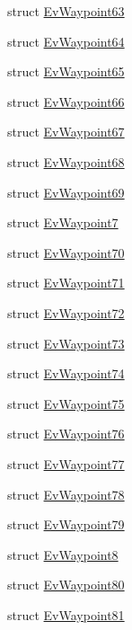 \begin{DoxyCompactItemize}
struct \hyperlink{structmove__base__z__client_1_1EvWaypoint63}{Ev\+Waypoint63}
\item 
struct \hyperlink{structmove__base__z__client_1_1EvWaypoint64}{Ev\+Waypoint64}
\item 
struct \hyperlink{structmove__base__z__client_1_1EvWaypoint65}{Ev\+Waypoint65}
\item 
struct \hyperlink{structmove__base__z__client_1_1EvWaypoint66}{Ev\+Waypoint66}
\item 
struct \hyperlink{structmove__base__z__client_1_1EvWaypoint67}{Ev\+Waypoint67}
\item 
struct \hyperlink{structmove__base__z__client_1_1EvWaypoint68}{Ev\+Waypoint68}
\item 
struct \hyperlink{structmove__base__z__client_1_1EvWaypoint69}{Ev\+Waypoint69}
\item 
struct \hyperlink{structmove__base__z__client_1_1EvWaypoint7}{Ev\+Waypoint7}
\item 
struct \hyperlink{structmove__base__z__client_1_1EvWaypoint70}{Ev\+Waypoint70}
\item 
struct \hyperlink{structmove__base__z__client_1_1EvWaypoint71}{Ev\+Waypoint71}
\item 
struct \hyperlink{structmove__base__z__client_1_1EvWaypoint72}{Ev\+Waypoint72}
\item 
struct \hyperlink{structmove__base__z__client_1_1EvWaypoint73}{Ev\+Waypoint73}
\item 
struct \hyperlink{structmove__base__z__client_1_1EvWaypoint74}{Ev\+Waypoint74}
\item 
struct \hyperlink{structmove__base__z__client_1_1EvWaypoint75}{Ev\+Waypoint75}
\item 
struct \hyperlink{structmove__base__z__client_1_1EvWaypoint76}{Ev\+Waypoint76}
\item 
struct \hyperlink{structmove__base__z__client_1_1EvWaypoint77}{Ev\+Waypoint77}
\item 
struct \hyperlink{structmove__base__z__client_1_1EvWaypoint78}{Ev\+Waypoint78}
\item 
struct \hyperlink{structmove__base__z__client_1_1EvWaypoint79}{Ev\+Waypoint79}
\item 
struct \hyperlink{structmove__base__z__client_1_1EvWaypoint8}{Ev\+Waypoint8}
\item 
struct \hyperlink{structmove__base__z__client_1_1EvWaypoint80}{Ev\+Waypoint80}
\item 
struct \hyperlink{structmove__base__z__client_1_1EvWaypoint81}{Ev\+Waypoint81}
\item 

\end{DoxyCompactItemize}
